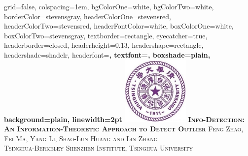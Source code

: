 \documentclass[portrait,final,a1paper,fontscale=0.3]{baposter}
\begin{document}

\begin{poster}%
  {
  grid=false,
  colspacing=1em,
  bgColorOne=white,
  bgColorTwo=white,
  borderColor=stevensgray,
  headerColorOne=stevensred,
  headerColorTwo=stevensred,
  headerFontColor=white,
  boxColorOne=white,
  boxColorTwo=stevensgray,
  textborder=rectangle,
  eyecatcher=true,
  headerborder=closed,
  headerheight=0.13\textheight,
  headershape=rectangle,
  headershade=shadelr,
  headerfont=\Large\bf\textsc, %
  textfont={\setlength{\parindent}{1.5em}},
  boxshade=plain,
  background=plain,
  linewidth=2pt
  }
  {
  		\includegraphics[height=9.0em]{thu.jpg}
  } %
  {\bf \textsc{ Info-Detection: An Information-Theoretic Approach to Detect Outlier } }
  {\textsc{  Feng Zhao, Fei Ma, Yang Li, Shao-Lun Huang and Lin Zhang \\ Tsinghua-Berkeley Shenzhen Institute, Tsinghua University}}
  {%
  }

    \newcommand{\colouredcircle}{%
      \tikz{\useasboundingbox (-0.2em,-0.32em) rectangle(0.2em,0.32em); \draw[draw=black,fill=lightblue,line width=0.03em] (0,0) circle(0.18em);}}


\end{poster}
\end{document}
